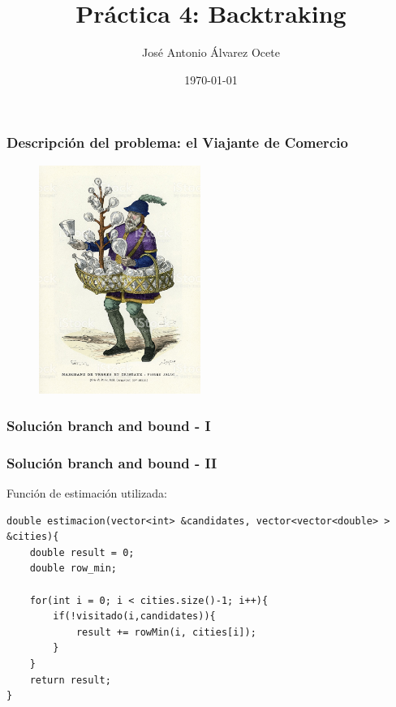 \documentclass[spanish]{beamer}
\title{Práctica 4: Backtraking}
\date{\today}
\author{José Antonio Álvarez Ocete}
\institute{Doble Grado en Ingeniería Informática y Matemáticas}
\begin{document}
\frame{\titlepage}

\begin{frame}[fragile]\frametitle{Descripción del problema: el Viajante de Comercio}
\begin{figure}[H]
	\centering
	\includegraphics[width=0.47\textwidth]{comerciante.jpg}
	\caption{}
\end{figure}
\end{frame}

\begin{frame}[fragile]\frametitle{Solución branch and bound - I}

	
\end{frame}

\begin{frame}[fragile]\frametitle{Solución branch and bound - II}
	
Función de estimación utilizada:
	
\begin{lstlisting}
double estimacion(vector<int> &candidates, vector<vector<double> > &cities){
	double result = 0;
	double row_min;
	
	for(int i = 0; i < cities.size()-1; i++){
		if(!visitado(i,candidates)){
			result += rowMin(i, cities[i]);
		}
	}
	return result;
}
\end{lstlisting}
	
\end{frame}
\end{document}
